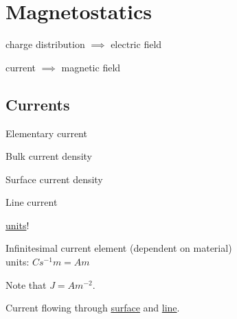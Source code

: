 \documentclass{article}
\begin{document}
\newpage

\section{Magnetostatics}

charge distribution $\implies$ electric field

current $\implies$ magnetic field

\subsection{Currents}

Elementary current

Bulk current density

Surface current density

Line current

\underline{units}!

Infinitesimal current element (dependent on material)\\
units: $Cs^{-1}m=Am$

Note that $J=Am^{-2}$.

Current flowing through \underline{surface} and \underline{line}.
\end{document}
